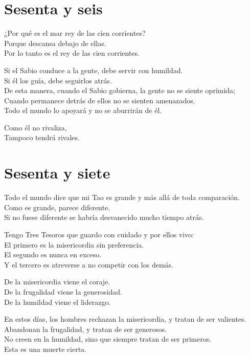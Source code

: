 \documentclass[book,b5paper,hidelinks,final]{memoir}
\begin{document}
	\chapter*{Sesenta y seis}
	
	¿Por qué es el mar rey de las cien corrientes?\\
	Porque descansa debajo de ellas.\\
	Por lo tanto es el rey de las cien corrientes.
	
	Si el Sabio conduce a la gente, debe servir con humildad.\\
	Si él los guía, debe seguirlos atrás.\\
	De esta manera, cuando el Sabio gobierna, la gente no se siente
	oprimida;\\
	Cuando permanece detrás de ellos no se sienten amenazados.\\
	Todo el mundo lo apoyará y no se aburrirán de él.
	
	Como él no rivaliza,\\
	Tampoco tendrá rivales.
	
	\chapter*{Sesenta y siete}
	
	Todo el mundo dice que mi Tao es grande y más allá de toda
	comparación.\\
	Como es grande, parece diferente.\\
	Si no fuese diferente se habría desvanecido mucho tiempo atrás.
	
	Tengo Tres Tesoros que guardo con cuidado y por ellos vivo:\\
	El primero es la misericordia sin preferencia.\\
	El segundo es nunca en exceso.\\
	Y el tercero es atreverse a no competir con los demás.
	
	De la misericordia viene el coraje.\\
	De la frugalidad viene la generosidad.\\
	De la humildad viene el liderazgo.
	
	En estos días, los hombres rechazan la misericordia, y tratan de ser
	valientes.\\
	Abandonan la frugalidad, y tratan de ser generosos.\\
	No creen en la humildad, sino que siempre tratan de ser primeros.\\
	Esta es una muerte cierta.
	
\end{document}
